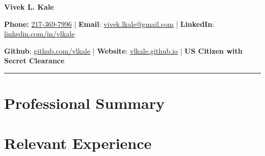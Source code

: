 \documentclass[11pt]{article}
\begin{document}
 

\begin{center}
\selectfont
    \Large \textbf{Vivek L. Kale} \\
    \normalsize

   \textbf{Phone:} \href{tel: +01 217-369-7996}{217-369-7996} | \textbf{Email}: \href{mailto:vivek.lkale@gmail.com}{vivek.lkale@gmail.com} | 
      \textbf{LinkedIn}: \href{http://linkedin.com/in/vlkale}{linkedin.com/in/vlkale} 

\textbf{Github}: \href{http://github.com/vlkale}{github.com/vlkale} | \textbf{Website}: \href{http://vlkale.github.io}{vlkale.github.io} | \textbf{US Citizen with Secret Clearance}
\end{center}
\noindent\rule{\linewidth}{0.4pt}


%

\section*{\selectfont Professional Summary}


\section*{\selectfont Relevant Experience}
 

\end{document}

